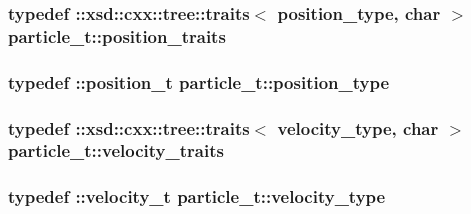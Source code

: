 \hypertarget{classparticle__t_a3917822f8a2a24b4674e88165aa15d24}{
\subsubsection[{position\-\_\-traits}]{\setlength{\rightskip}{0pt plus 5cm}typedef \-::xsd\-::cxx\-::tree\-::traits$<$ {\bf position\-\_\-type}, char $>$ {\bf particle\-\_\-t\-::position\-\_\-traits}}}\label{classparticle__t_a3917822f8a2a24b4674e88165aa15d24}
\hypertarget{classparticle__t_af0130f9c47a13c68332f04389a6f0d2c}{
\subsubsection[{position\-\_\-type}]{\setlength{\rightskip}{0pt plus 5cm}typedef \-::{\bf position\-\_\-t} {\bf particle\-\_\-t\-::position\-\_\-type}}}\label{classparticle__t_af0130f9c47a13c68332f04389a6f0d2c}
\hypertarget{classparticle__t_a97b4645b5dfa77c95f13a142064045db}{
\subsubsection[{velocity\-\_\-traits}]{\setlength{\rightskip}{0pt plus 5cm}typedef \-::xsd\-::cxx\-::tree\-::traits$<$ {\bf velocity\-\_\-type}, char $>$ {\bf particle\-\_\-t\-::velocity\-\_\-traits}}}\label{classparticle__t_a97b4645b5dfa77c95f13a142064045db}
\hypertarget{classparticle__t_a19095006cf2a2dd955fc026420b38512}{
\subsubsection[{velocity\-\_\-type}]{\setlength{\rightskip}{0pt plus 5cm}typedef \-::{\bf velocity\-\_\-t} {\bf particle\-\_\-t\-::velocity\-\_\-type}}}\label{classparticle__t_a19095006cf2a2dd955fc026420b38512}


